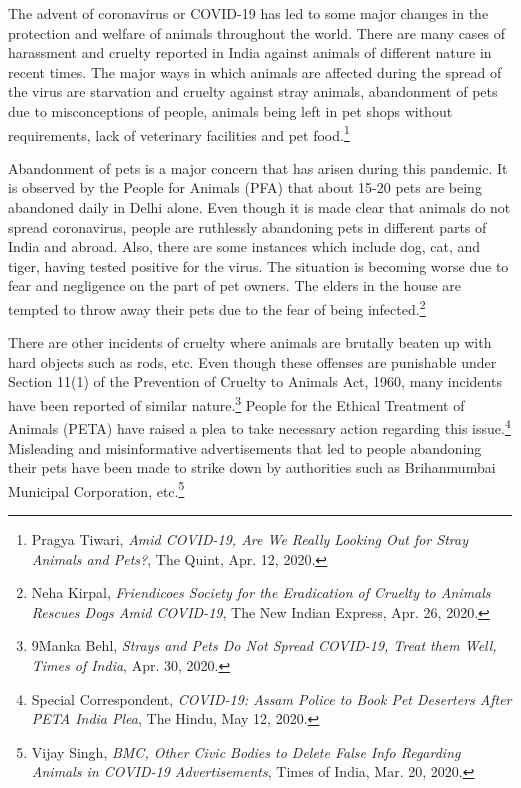 \begin{multicols}{2}

\noi
The advent of coronavirus or COVID-19 has led to some major changes in the protection and
welfare of animals throughout the world. There are many cases of harassment and cruelty
reported in India against animals of different nature in recent times. The major ways in which
animals are affected during the spread of the virus are starvation and cruelty against stray
animals, abandonment of pets due to misconceptions of people, animals being left in pet
shops without requirements, lack of veterinary facilities and pet food.\footnote{Pragya Tiwari, \textit{Amid COVID-19, Are We Really Looking Out for Stray Animals and Pets?}, The Quint, Apr. 12, 2020.}

\vspace{-.15cm}

\noi
Abandonment of pets is a major concern that has arisen during this pandemic. It is observed
by the People for Animals (PFA) that about 15-20 pets are being abandoned daily in Delhi
alone. Even though it is made clear that animals do not spread coronavirus, people are
ruthlessly abandoning pets in different parts of India and abroad. Also, there are some
instances which include dog, cat, and tiger, having tested positive for the virus. The situation
is becoming worse due to fear and negligence on the part of pet owners. The elders in the
house are tempted to throw away their pets due to the fear of being infected.\footnote{Neha Kirpal, \textit{Friendicoes Society for the Eradication of Cruelty to Animals Rescues Dogs Amid COVID-19}, The New Indian Express, Apr. 26, 2020. }

\vspace{-.15cm}

\noi
There are other incidents of cruelty where animals are brutally beaten up with hard objects
such as rods, etc. Even though these offenses are punishable under Section 11(1) of the
Prevention of Cruelty to Animals Act, 1960, many incidents have been reported of similar
nature.\footnote{9Manka Behl, \textit{Strays and Pets Do Not Spread COVID-19, Treat them Well, Times of India}, Apr. 30, 2020.} People for the Ethical Treatment of Animals (PETA) have raised a plea to take necessary action regarding this issue.\footnote{Special Correspondent, \textit{COVID-19: Assam Police to Book Pet Deserters After PETA India Plea}, The Hindu, May 12, 2020.} Misleading and misinformative advertisements that
led to people abandoning their pets have been made to strike down by authorities such as
Brihanmumbai Municipal Corporation, etc.\footnote{Vijay Singh, \textit{BMC, Other Civic Bodies to Delete False Info Regarding Animals in COVID-19 Advertisements}, Times of India, Mar. 20, 2020.}


\end{multicols}
